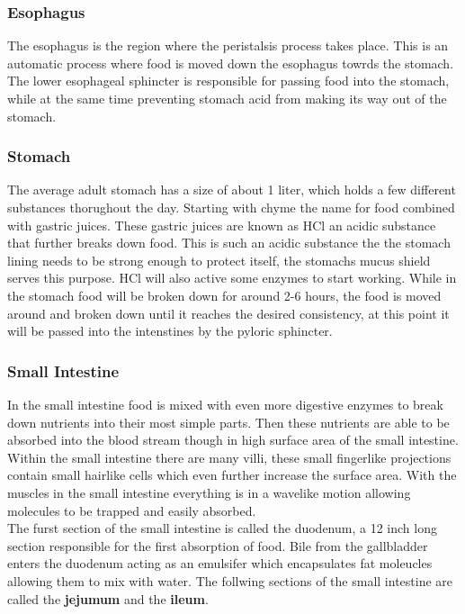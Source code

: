 \documentclass[letterpaper, 11pt]{article}
\begin{document}
\subsubsection{Esophagus}
\label{sec:org75352ff}
The esophagus is the region where the peristalsis process takes place. This is an automatic process where food is moved down the esophagus towrds the stomach. The lower esophageal sphincter is responsible for passing food into the stomach, while at the same time preventing stomach acid from making its way out of the stomach.\\
\subsubsection{Stomach}
\label{sec:org578418c}
The average adult stomach has a size of about 1 liter, which holds a few different substances thorughout the day. Starting with chyme the name for food combined with gastric juices. These gastric juices are known as HCl an acidic substance that further breaks down food. This is such an acidic substance the the stomach lining needs to be strong enough to protect itself, the stomachs mucus shield serves this purpose. HCl will also active some enzymes to start working. While in the stomach food will be broken down for around 2-6 hours, the food is moved around and broken down until it reaches the desired consistency, at this point it will be passed into the intenstines by the pyloric sphincter.\\
\subsubsection{Small Intestine}
\label{sec:org17a07c9}
In the small intestine food is mixed with even more digestive enzymes to break down nutrients into their most simple parts. Then these nutrients are able to be absorbed into the blood stream though in high surface area of the small intestine. Within the small intestine there are many villi, these small fingerlike projections contain small hairlike cells which even further increase the surface area. With the muscles in the small intestine everything is in a wavelike motion allowing molecules to be trapped and easily absorbed.\\
The furst section of the small intestine is called the duodenum, a 12 inch long section responsible for the first absorption of food. Bile from the gallbladder enters the duodenum acting as an emulsifer which encapsulates fat moleucles allowing them to mix with water. The follwing sections of the small intestine are called the \textbf{jejumum} and the \textbf{ileum}.\\
\end{document}
